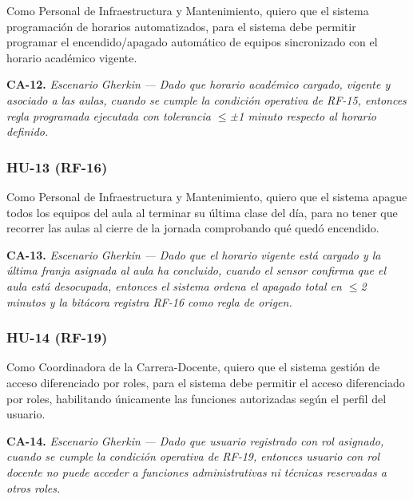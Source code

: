 
Como Personal de Infraestructura y Mantenimiento, quiero que el sistema programación de horarios automatizados, para el sistema debe permitir programar el encendido/apagado automático de equipos sincronizado con el horario académico vigente.


\textbf{CA-12.} \textit{Escenario }\textit{Gherkin}\textit{ --- Dado que horario académico cargado, vigente y asociado a las aulas, cuando se cumple la condición operativa de RF-15, entonces regla programada ejecutada con tolerancia $\leq$±1 minuto respecto al horario definido.}


\subsubsection*{HU-13 (RF-16)}


Como Personal de Infraestructura y Mantenimiento, quiero que el sistema apague todos los equipos del aula al terminar su última clase del día, para no tener que recorrer las aulas al cierre de la jornada comprobando qué quedó encendido.


\textbf{CA-13.} \textit{Escenario }\textit{Gherkin}\textit{ --- Dado que el horario vigente está cargado y la última franja asignada al aula ha concluido, cuando el sensor confirma que el aula está desocupada, entonces el sistema ordena el apagado total en $\leq$2 minutos y la bitácora registra RF-16 como regla de origen.}


\subsubsection*{HU-14 (RF-19)}


Como Coordinadora de la Carrera-Docente, quiero que el sistema gestión de acceso diferenciado por roles, para el sistema debe permitir el acceso diferenciado por roles, habilitando únicamente las funciones autorizadas según el perfil del usuario.


\textbf{CA-14.} \textit{Escenario }\textit{Gherkin}\textit{ --- Dado que usuario registrado con rol asignado, cuando se cumple la condición operativa de RF-19, entonces usuario con rol docente no puede acceder a funciones administrativas ni técnicas reservadas a otros roles.}



